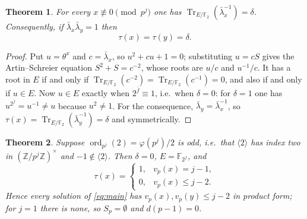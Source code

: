 \documentclass[a4paper]{article}
\newtheorem{theorem}{Theorem}[section]
\newcommand{\F}{\mathbb{F}}
\newcommand{\Z}{\mathbb{Z}}
\newcommand{\ord}[2][]{\operatorname{ord}_{#1}\!\left(#2\right)}
\DeclareMathOperator{\Tr}{Tr}
\begin{document}
\begin{theorem}\label{thm:trace}
	For every $x\not\equiv0\pmod{p^j}$ one has
	$\Tr_{E/\F_2}\!\left(\bar\lambda_x^{-1}\right)=\delta$.
	Consequently, if $\bar\lambda_x\bar\lambda_y=1$ then
	\[
		\tau(x)=\tau(y)=\delta .
	\]
\end{theorem}

\begin{proof}
	Put $u=\theta^{x}$ and $c=\bar\lambda_x$, so $u^{2}+cu+1=0$;
	substituting $u=cS$ gives the Artin--Schreier equation
	$S^{2}+S=c^{-2}$, whose roots are $u/c$ and $u^{-1}/c$.  It has a root
	in $E$ if and only if $\Tr_{E/\F_2}(c^{-2})=\Tr_{E/\F_2}(c^{-1})=0$,
	and also if and only if $u\in E$.  Now $u\in E$ exactly when
	$2^{\bar f}\equiv1$, i.e.\ when $\delta=0$: for $\delta=1$ one has
	$u^{2^{\bar f}}=u^{-1}\ne u$ because $u^{2}\ne1$.
	For the consequence, $\bar\lambda_y=\bar\lambda_x^{-1}$, so
	$\tau(x)=\Tr_{E/\F_2}(\bar\lambda_y^{-1})=\delta$ and symmetrically.
\end{proof}

\begin{theorem}\label{thm:twoorbit}
	Suppose $\ord[p^{j}]{2}=\varphi(p^{j})/2$ is odd, i.e.\ that
	$\langle2\rangle$ has index two in $(\Z/p^{j}\Z)^{\times}$ and
	$-1\notin\langle2\rangle$.  Then $\delta=0$, $E=\F_{2^{f}}$, and
	\[
		\tau(x)=
		\begin{cases}
			1,& v_p(x)=j-1,\\
			0,& v_p(x)\leq j-2 .
		\end{cases}
	\]
	Hence every solution of \eqref{eq:main} has
	$v_p(x),v_p(y)\leq j-2$ in product form; for $j=1$ there is none, so
	$S_p=\emptyset$ and $d(p-1)=0$.
\end{theorem}
\end{document}
